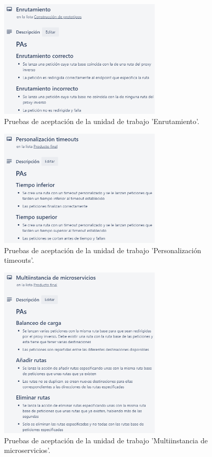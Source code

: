 \documentclass[11pt,spanish,listoffigures]{tfgetsinf}
\begin{document}
\begin{figure}[ht]
\centering
\includegraphics[width=0.7\textwidth]{imagenes/PAsEnrutamiento}
\caption{Pruebas de aceptación de la unidad de trabajo 'Enrutamiento'.}
	\label{PAsEnrutamiento}
\end{figure}

\begin{figure}[ht]
\centering
\includegraphics[width=0.7\textwidth]{imagenes/PAsPersonalizacionTimeouts}
\caption{Pruebas de aceptación de la unidad de trabajo 'Personalización timeouts'.}
	\label{PAsPersonalizacionTimeouts}
\end{figure}

\begin{figure}[ht]
\centering
\includegraphics[width=0.7\textwidth]{imagenes/PAsMultiinstanciaDeMicroservicios}
\caption{Pruebas de aceptación de la unidad de trabajo 'Multiinstancia de microservicios'.}
	\label{PAsMultiinstanciaDeMicroservicios}
\end{figure}
\end{document}
